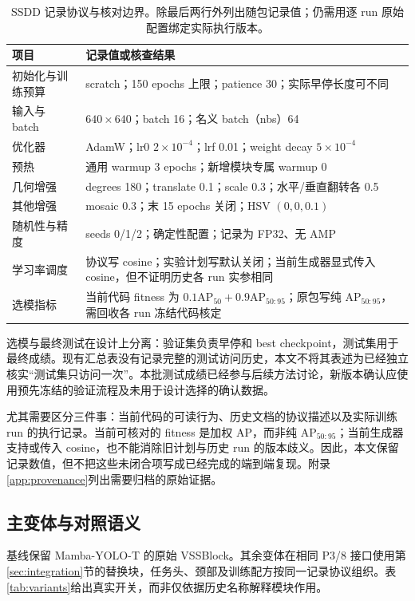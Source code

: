 \documentclass[UTF8,11pt,a4paper,fontset=fandol]{ctexart}
\newcommand{\ap}{\mathrm{AP}}
\begin{document}
\begin{table}[!htbp]\centering\small
\caption{SSDD 记录协议与核对边界。除最后两行外列出随包记录值；仍需用逐 run 原始配置绑定实际执行版本。}
\label{tab:protocol}
\begin{tabularx}{\linewidth}{P{3.55cm}Y}
\toprule
项目 & 记录值或核查结果\\
\midrule
初始化与训练预算 & scratch；150 epochs 上限；patience 30；实际早停长度可不同\\
输入与 batch & $640\times640$；batch 16；名义 batch（nbs）64\\
优化器 & AdamW；lr0 $2\times10^{-4}$；lrf 0.01；weight decay $5\times10^{-4}$\\
预热 & 通用 warmup 3 epochs；新增模块专属 warmup 0\\
几何增强 & degrees 180；translate 0.1；scale 0.3；水平/垂直翻转各 0.5\\
其他增强 & mosaic 0.3；末 15 epochs 关闭；HSV $(0,0,0.1)$\\
随机性与精度 & seeds 0/1/2；确定性配置；记录为 FP32、无 AMP\\
学习率调度 & 协议写 cosine；实验计划写默认关闭；当前生成器显式传入 cosine，但不证明历史各 run 实参相同\\
选模指标 & 当前代码 fitness 为 $0.1\ap_{50}+0.9\ap_{50:95}$；原包写纯 $\ap_{50:95}$，需回收各 run 冻结代码核定\\
\bottomrule
\end{tabularx}
\end{table}

选模与最终测试在设计上分离：验证集负责早停和 best checkpoint，测试集用于最终成绩。现有汇总表没有记录完整的测试访问历史，本文不将其表述为已经独立核实“测试集只访问一次”。本批测试成绩已经参与后续方法讨论，新版本确认应使用预先冻结的验证流程及未用于设计选择的确认数据。

尤其需要区分三件事：当前代码的可读行为、历史文档的协议描述以及实际训练 run 的执行记录。当前可核对的 fitness 是加权 AP，而非纯 $\ap_{50:95}$；当前生成器支持或传入 cosine，也不能消除旧计划与历史 run 的版本歧义。因此，本文保留记录数值，但不把这些未闭合项写成已经完成的端到端复现。附录\ref{app:provenance}列出需要归档的原始证据。

\subsection{主变体与对照语义}
基线保留 Mamba-YOLO-T 的原始 VSSBlock。其余变体在相同 P3/8 接口使用第\ref{sec:integration}节的替换块，任务头、颈部及训练配方按同一记录协议组织。表\ref{tab:variants}给出真实开关，而非仅依据历史名称解释模块作用。
\end{document}
